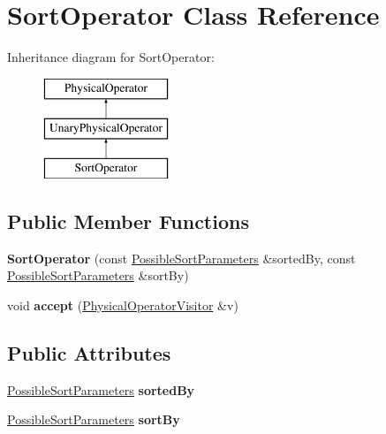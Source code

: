 \hypertarget{class_sort_operator}{\section{Sort\+Operator Class Reference}
\label{class_sort_operator}
}
Inheritance diagram for Sort\+Operator\+:\begin{figure}[H]
\begin{center}
\leavevmode
\includegraphics[height=3.000000cm]{class_sort_operator}
\end{center}
\end{figure}
\subsection*{Public Member Functions}
\begin{DoxyCompactItemize}
\item 
\hypertarget{class_sort_operator_aae40824efc238dfbf2bbde0badb66138}{{\bfseries Sort\+Operator} (const \hyperlink{class_possible_sort_parameters}{Possible\+Sort\+Parameters} \&sorted\+By, const \hyperlink{class_possible_sort_parameters}{Possible\+Sort\+Parameters} \&sort\+By)}\label{class_sort_operator_aae40824efc238dfbf2bbde0badb66138}

\item 
\hypertarget{class_sort_operator_aff5d834234616ce2d36efda9639b734b}{void {\bfseries accept} (\hyperlink{class_physical_operator_visitor}{Physical\+Operator\+Visitor} \&v)}\label{class_sort_operator_aff5d834234616ce2d36efda9639b734b}

\end{DoxyCompactItemize}
\subsection*{Public Attributes}
\begin{DoxyCompactItemize}
\item 
\hypertarget{class_sort_operator_a7e3eb99b6ce1ed9d927a5e3975269be5}{\hyperlink{class_possible_sort_parameters}{Possible\+Sort\+Parameters} {\bfseries sorted\+By}}\label{class_sort_operator_a7e3eb99b6ce1ed9d927a5e3975269be5}

\item 
\hypertarget{class_sort_operator_a36cfb27acb196ceb5d801b62dc2494cc}{\hyperlink{class_possible_sort_parameters}{Possible\+Sort\+Parameters} {\bfseries sort\+By}}\label{class_sort_operator_a36cfb27acb196ceb5d801b62dc2494cc}

\end{DoxyCompactItemize}


